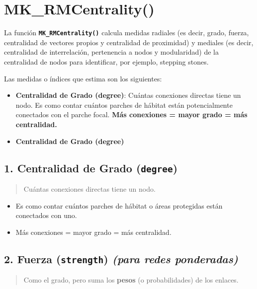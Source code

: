 \documentclass[
]{book}
\providecommand{\tightlist}{%
  \setlength{\itemsep}{0pt}\setlength{\parskip}{0pt}}
\begin{document}
\section{MK\_RMCentrality()}\label{mk_rmcentrality}

La función \textbf{\texttt{MK\_RMCentrality()}} calcula medidas radiales (es decir, grado, fuerza, centralidad de vectores propios y centralidad de proximidad) y mediales (es decir, centralidad de interrelación, pertenencia a nodos y modularidad) de la centralidad de nodos para identificar, por ejemplo, stepping stones.

Las medidas o índices que estima son los siguientes:

\begin{itemize}
\tightlist
\item
  \textbf{Centralidad de Grado (degree)}: Cuántas conexiones directas tiene un nodo. Es como contar cuántos parches de hábitat están potencialmente conectados con el parche focal.
  \textbf{Más conexiones = mayor grado = más centralidad.}
\item
  \textbf{Centralidad de Grado (degree)}
\end{itemize}

\subsection{\texorpdfstring{1. Centralidad de Grado (\texttt{degree})}{1. Centralidad de Grado (degree)}}\label{centralidad-de-grado-degree}

\begin{quote}
Cuántas conexiones directas tiene un nodo.
\end{quote}

\begin{itemize}
\tightlist
\item
  Es como contar cuántos parches de hábitat o áreas protegidas están conectados con uno.
\item
  Más conexiones = mayor grado = más centralidad.
\end{itemize}

\subsection{\texorpdfstring{2. Fuerza (\texttt{strength}) \emph{(para redes ponderadas)}}{2. Fuerza (strength) (para redes ponderadas)}}\label{fuerza-strength-para-redes-ponderadas}

\begin{quote}
Como el grado, pero suma los \textbf{pesos} (o probabilidades) de los enlaces.
\end{quote}
\end{document}
